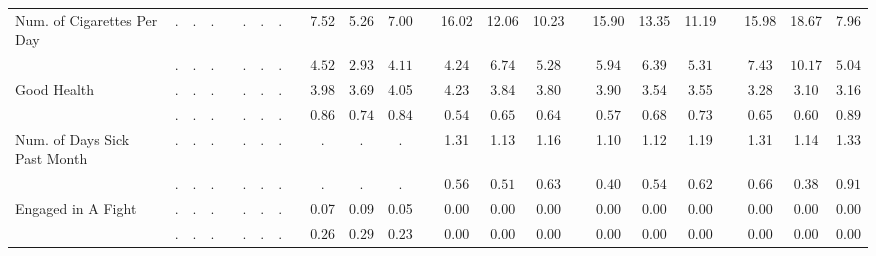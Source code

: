 \begin{center}
{\begin{longtable}{L{12em} c c c p{1.2em} c c c p{1.2em} c c c p{1.2em} c c c p{1.2em} c c c p{1.2em} c c c}
Num. of Cigarettes Per Day & . &         . &         . & &         . &         . &         . & &      7.52 &      5.26 &      7.00 & &     16.02 &     12.06 &     10.23 & &     15.90 &     13.35 &     11.19 & &     15.98 &     18.67 &      7.96 \\*
& $\mathit{        .}$ & $\mathit{        .}$ & $\mathit{        .}$ & & $\mathit{        .}$ & $\mathit{        .}$ & $\mathit{        .}$ & & $\mathit{     4.52}$ & $\mathit{     2.93}$ & $\mathit{     4.11}$ & & $\mathit{     4.24}$ & $\mathit{     6.74}$ & $\mathit{     5.28}$ & & $\mathit{     5.94}$ & $\mathit{     6.39}$ & $\mathit{     5.31}$ & & $\mathit{     7.43}$ & $\mathit{    10.17}$ & $\mathit{     5.04}$ \\[.7em]
Good Health & . &         . &         . & &         . &         . &         . & &      3.98 &      3.69 &      4.05 & &      4.23 &      3.84 &      3.80 & &      3.90 &      3.54 &      3.55 & &      3.28 &      3.10 &      3.16 \\*
& $\mathit{        .}$ & $\mathit{        .}$ & $\mathit{        .}$ & & $\mathit{        .}$ & $\mathit{        .}$ & $\mathit{        .}$ & & $\mathit{     0.86}$ & $\mathit{     0.74}$ & $\mathit{     0.84}$ & & $\mathit{     0.54}$ & $\mathit{     0.65}$ & $\mathit{     0.64}$ & & $\mathit{     0.57}$ & $\mathit{     0.68}$ & $\mathit{     0.73}$ & & $\mathit{     0.65}$ & $\mathit{     0.60}$ & $\mathit{     0.89}$ \\[.7em]
Num. of Days Sick Past Month & . &         . &         . & &         . &         . &         . & &         . &         . &         . & &      1.31 &      1.13 &      1.16 & &      1.10 &      1.12 &      1.19 & &      1.31 &      1.14 &      1.33 \\*
& $\mathit{        .}$ & $\mathit{        .}$ & $\mathit{        .}$ & & $\mathit{        .}$ & $\mathit{        .}$ & $\mathit{        .}$ & & $\mathit{        .}$ & $\mathit{        .}$ & $\mathit{        .}$ & & $\mathit{     0.56}$ & $\mathit{     0.51}$ & $\mathit{     0.63}$ & & $\mathit{     0.40}$ & $\mathit{     0.54}$ & $\mathit{     0.62}$ & & $\mathit{     0.66}$ & $\mathit{     0.38}$ & $\mathit{     0.91}$ \\[.7em]
Engaged in A Fight & . &         . &         . & &         . &         . &         . & &      0.07 &      0.09 &      0.05 & &      0.00 &      0.00 &      0.00 & &      0.00 &      0.00 &      0.00 & &      0.00 &      0.00 &      0.00 \\*
& $\mathit{        .}$ & $\mathit{        .}$ & $\mathit{        .}$ & & $\mathit{        .}$ & $\mathit{        .}$ & $\mathit{        .}$ & & $\mathit{     0.26}$ & $\mathit{     0.29}$ & $\mathit{     0.23}$ & & $\mathit{     0.00}$ & $\mathit{     0.00}$ & $\mathit{     0.00}$ & & $\mathit{     0.00}$ & $\mathit{     0.00}$ & $\mathit{     0.00}$ & & $\mathit{     0.00}$ & $\mathit{     0.00}$ & $\mathit{     0.00}$ \\[.7em]

\end{longtable}}
\end{center}
